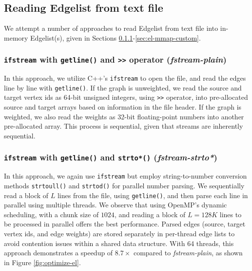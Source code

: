 \subsection{Reading Edgelist from text file}

We attempt a number of approaches to read Edgelist from text file into in-memory Edgelist(s), given in Sections \ref{sec:el-fstream-plain}-\ref{sec:el-mmap-custom}.


\subsubsection{\texttt{ifstream} with \texttt{getline()} and \texttt{>>} operator (\textit{fstream-plain})}
\label{sec:el-fstream-plain}

In this approach, we utilize C++'s \texttt{ifstream} to open the file, and read the edges line by line with \texttt{getline()}. If the graph is unweighted, we read the source and target vertex ids as 64-bit unsigned integers, using \texttt{>>} operator, into pre-allocated source and target arrays based on information in the file header. If the graph is weighted, we also read the weights as 32-bit floating-point numbers into another pre-allocated array. This process is sequential, given that streams are inherently sequential.


\subsubsection{\texttt{ifstream} with \texttt{getline()} and \texttt{strto*()} (\textit{fstream-strto*})}
\label{sec:el-fstream-stro*}

In this approach, we again use \texttt{ifstream} but employ string-to-number conversion methods \texttt{strtoull()} and \texttt{strtod()} for parallel number parsing. We sequentially read a block of $L$ lines from the file, using \texttt{getline()}, and then parse each line in parallel using multiple threads. We observe that using OpenMP's dynamic scheduling, with a chunk size of $1024$, and reading a block of $L=128K$ lines to be processed in parallel offers the best performance. Parsed edges (source, target vertex ids, and edge weights) are stored separately in per-thread edge lists to avoid contention issues within a shared data structure. With 64 threads, this approach demonstrates a speedup of $8.7\times$ compared to \textit{fstream-plain}, as shown in Figure \ref{fig:optimize-el}.




